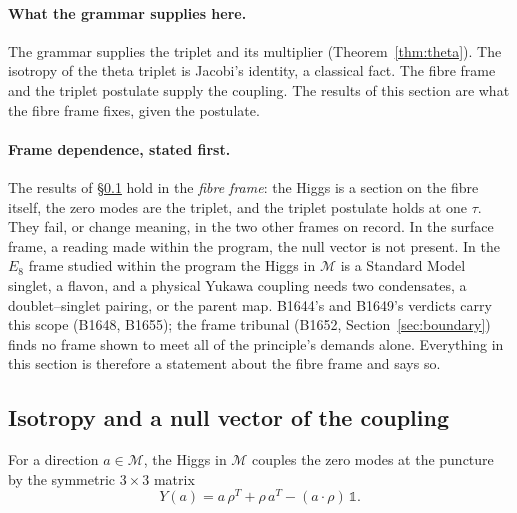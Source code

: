 \paragraph{What the grammar supplies here.}
The grammar supplies the triplet and its multiplier (Theorem~\ref{thm:theta}). The isotropy of the theta triplet is Jacobi's
identity, a classical fact. The fibre frame and the triplet postulate supply the coupling. The results of this section are
what the fibre frame fixes, given the postulate.

\paragraph{Frame dependence, stated first.}
The results of \S\ref{sec:t4} hold in the \emph{fibre frame}: the Higgs is a section on the fibre itself, the zero modes
are the triplet, and the triplet postulate holds at one $\tau$. They fail, or change meaning, in the two other frames on
record. In the surface frame, a reading made within the program, the null vector is not present. In the $E_8$ frame
studied within the program
the Higgs in $\mathcal M$ is a Standard Model singlet, a flavon, and a physical Yukawa coupling needs two condensates, a
doublet--singlet pairing, or the parent map. B1644's and B1649's verdicts carry this scope (B1648, B1655); the frame
tribunal (B1652, Section~\ref{sec:boundary}) finds no frame shown to meet all of the principle's demands alone. Everything in this
section is therefore a statement about the fibre frame and says so.

\subsection{Isotropy and a null vector of the coupling}\label{sec:t4}

For a direction $a\in\mathcal M$, the Higgs in $\mathcal M$ couples the zero modes at the puncture by the symmetric
$3\times3$ matrix
\[
  Y(a)=a\,\rho^{T}+\rho\,a^{T}-(a\cdot\rho)\,\mathbb 1 .
\]

